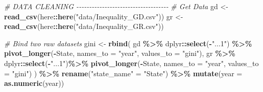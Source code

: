 \documentclass[11pt,a4paper,]{article}
\newenvironment{Shaded}{\begin{snugshade}}{\end{snugshade}}
\newcommand{\AttributeTok}[1]{\textcolor[rgb]{0.13,0.29,0.53}{#1}}
\newcommand{\CommentTok}[1]{\textcolor[rgb]{0.56,0.35,0.01}{\textit{#1}}}
\newcommand{\FunctionTok}[1]{\textcolor[rgb]{0.13,0.29,0.53}{\textbf{#1}}}
\newcommand{\NormalTok}[1]{#1}
\newcommand{\OtherTok}[1]{\textcolor[rgb]{0.56,0.35,0.01}{#1}}
\newcommand{\SpecialCharTok}[1]{\textcolor[rgb]{0.81,0.36,0.00}{\textbf{#1}}}
\newcommand{\StringTok}[1]{\textcolor[rgb]{0.31,0.60,0.02}{#1}}
\begin{document}
\begin{Shaded}
\begin{Highlighting}[]
\CommentTok{\# DATA CLEANING {-}{-}{-}{-}{-}{-}{-}{-}{-}{-}{-}{-}{-}{-}{-}{-}{-}{-}{-}{-}{-}{-}{-}{-}{-}{-}{-}{-}{-}{-}{-}{-}{-}{-}{-}{-}}
\CommentTok{\# Get Data}
\NormalTok{gd }\OtherTok{\textless{}{-}} \FunctionTok{read\_csv}\NormalTok{(here}\SpecialCharTok{::}\FunctionTok{here}\NormalTok{(}\StringTok{"data/Inequality\_GD.csv"}\NormalTok{))}
\NormalTok{gr }\OtherTok{\textless{}{-}} \FunctionTok{read\_csv}\NormalTok{(here}\SpecialCharTok{::}\FunctionTok{here}\NormalTok{(}\StringTok{"data/Inequality\_GR.csv"}\NormalTok{))}

\CommentTok{\# Bind two raw datasets}
\NormalTok{gini }\OtherTok{\textless{}{-}} \FunctionTok{rbind}\NormalTok{(}
\NormalTok{  gd }\SpecialCharTok{\%\textgreater{}\%}\NormalTok{  dplyr}\SpecialCharTok{::}\FunctionTok{select}\NormalTok{(}\SpecialCharTok{{-}}\StringTok{"...1"}\NormalTok{) }\SpecialCharTok{\%\textgreater{}\%} 
    \FunctionTok{pivot\_longer}\NormalTok{(}\SpecialCharTok{{-}}\NormalTok{State, }\AttributeTok{names\_to =} \StringTok{"year"}\NormalTok{, }\AttributeTok{values\_to =} \StringTok{"gini"}\NormalTok{),}
\NormalTok{  gr }\SpecialCharTok{\%\textgreater{}\%}\NormalTok{ dplyr}\SpecialCharTok{::}\FunctionTok{select}\NormalTok{(}\SpecialCharTok{{-}}\StringTok{"...1"}\NormalTok{)}\SpecialCharTok{\%\textgreater{}\%} 
    \FunctionTok{pivot\_longer}\NormalTok{(}\SpecialCharTok{{-}}\NormalTok{State, }\AttributeTok{names\_to =} \StringTok{"year"}\NormalTok{, }\AttributeTok{values\_to =} \StringTok{"gini"}\NormalTok{)  }
\NormalTok{) }\SpecialCharTok{\%\textgreater{}\%} 
  \FunctionTok{rename}\NormalTok{(}\StringTok{"state\_name"} \OtherTok{=} \StringTok{"State"}\NormalTok{) }\SpecialCharTok{\%\textgreater{}\%} 
  \FunctionTok{mutate}\NormalTok{(}\AttributeTok{year =} \FunctionTok{as.numeric}\NormalTok{(year))}


\end{Highlighting}
\end{Shaded}
\end{document}
